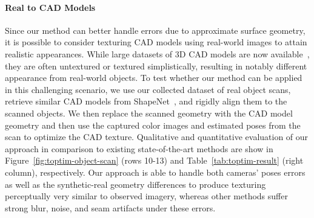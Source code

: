 \paragraph*{Real to CAD Models}
Since our method can better handle errors due to approximate surface geometry, it is possible to consider texturing CAD models using real-world images to attain realistic appearances.   While large datasets of 3D CAD models are now available~\cite{chang2015shapenet}, they are often untextured or textured simplistically, resulting in notably different appearance from real-world objects. 
To test whether our method can be applied in this challenging scenario, 
we use our collected dataset of real object scans, retrieve similar CAD models from ShapeNet~\cite{chang2015shapenet}, and rigidly align them to the scanned objects.
We then replace the scanned geometry with the CAD model geometry and then use the captured color images and estimated poses from the scan to optimize the CAD texture.
Qualitative and quantitative evaluation of our approach in comparison to existing state-of-the-art methods are show in Figure~\ref{fig:toptim-object-scan} (rows 10-13) and Table~\ref{tab:toptim-result} (right column), respectively.
Our approach is able to handle both cameras' poses errors as well as the synthetic-real geometry differences to produce texturing perceptually very similar to observed imagery, whereas other methods suffer strong blur, noise, and seam artifacts under these errors.

